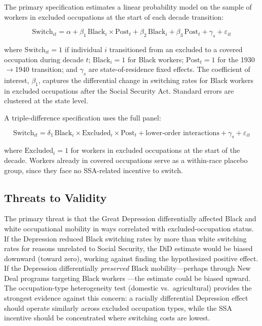 \documentclass[12pt]{article}
\begin{document}
The primary specification estimates a linear probability model on the sample of workers in excluded occupations at the start of each decade transition:

\begin{equation}
\text{Switch}_{it} = \alpha + \beta_1 \, \text{Black}_i \times \text{Post}_t + \beta_2 \, \text{Black}_i + \beta_3 \, \text{Post}_t + \gamma_s + \varepsilon_{it}
\label{eq:did}
\end{equation}

\noindent where $\text{Switch}_{it} = 1$ if individual $i$ transitioned from an excluded to a covered occupation during decade $t$; $\text{Black}_i = 1$ for Black workers; $\text{Post}_t = 1$ for the 1930$\to$1940 transition; and $\gamma_s$ are state-of-residence fixed effects. The coefficient of interest, $\beta_1$, captures the differential change in switching rates for Black workers in excluded occupations after the Social Security Act. Standard errors are clustered at the state level.

A triple-difference specification uses the full panel:

\begin{equation}
\text{Switch}_{it} = \delta_1 \, \text{Black}_i \times \text{Excluded}_i \times \text{Post}_t + \text{lower-order interactions} + \gamma_s + \varepsilon_{it}
\label{eq:ddd}
\end{equation}

\noindent where $\text{Excluded}_i = 1$ for workers in excluded occupations at the start of the decade. Workers already in covered occupations serve as a within-race placebo group, since they face no SSA-related incentive to switch.

\subsection{Threats to Validity}

The primary threat is that the Great Depression differentially affected Black and white occupational mobility in ways correlated with excluded-occupation status. If the Depression reduced Black switching rates by more than white switching rates for reasons unrelated to Social Security, the DiD estimate would be biased downward (toward zero), working against finding the hypothesized positive effect. If the Depression differentially \textit{preserved} Black mobility---perhaps through New Deal programs targeting Black workers \citep{fishback2007}---the estimate could be biased upward. The occupation-type heterogeneity test (domestic vs.\ agricultural) provides the strongest evidence against this concern: a racially differential Depression effect should operate similarly across excluded occupation types, while the SSA incentive should be concentrated where switching costs are lowest.
\end{document}
